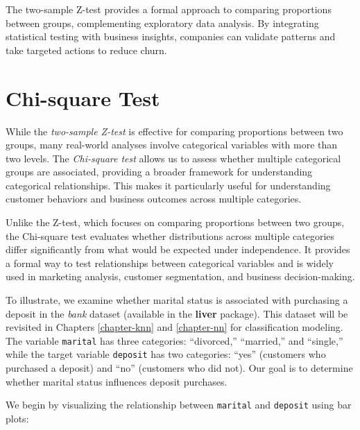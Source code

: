 \documentclass[
]{book}
\newcommand{\passthrough}[1]{#1}
\theoremstyle{definition}
\theoremstyle{definition}
\theoremstyle{definition}
\theoremstyle{definition}
\theoremstyle{remark}
\begin{document}
The two-sample Z-test provides a formal approach to comparing proportions between groups, complementing exploratory data analysis. By integrating statistical testing with business insights, companies can validate patterns and take targeted actions to reduce churn.

\section{Chi-square Test}\label{chi-square-test}

While the \emph{two-sample Z-test} is effective for comparing proportions between two groups, many real-world analyses involve categorical variables with more than two levels. The \emph{Chi-square test} allows us to assess whether multiple categorical groups are associated, providing a broader framework for understanding categorical relationships. This makes it particularly useful for understanding customer behaviors and business outcomes across multiple categories.

Unlike the Z-test, which focuses on comparing proportions between two groups, the Chi-square test evaluates whether distributions across multiple categories differ significantly from what would be expected under independence. It provides a formal way to test relationships between categorical variables and is widely used in marketing analysis, customer segmentation, and business decision-making.

To illustrate, we examine whether marital status is associated with purchasing a deposit in the \emph{bank} dataset (available in the \textbf{liver} package). This dataset will be revisited in Chapters \ref{chapter-knn} and \ref{chapter-nn} for classification modeling. The variable \passthrough{\lstinline!marital!} has three categories: ``divorced,'' ``married,'' and ``single,'' while the target variable \passthrough{\lstinline!deposit!} has two categories: ``yes'' (customers who purchased a deposit) and ``no'' (customers who did not). Our goal is to determine whether marital status influences deposit purchases.

We begin by visualizing the relationship between \passthrough{\lstinline!marital!} and \passthrough{\lstinline!deposit!} using bar plots:
\end{document}
